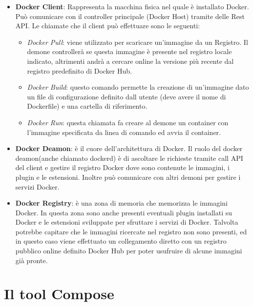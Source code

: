 \begin{itemize}
    \item \textbf{Docker Client}: Rappresenta la macchina fisica nel quale è installato Docker. Può comunicare con il controller principale (Docker Host) tramite delle Rest API.
    Le chiamate che il client può effettuare sono le seguenti:
        \begin{itemize}
            \item \textit{Docker Pull}: viene utilizzato per scaricare un'immagine da un Registro. Il demone controllerà se questa immagine è presente nel registro locale indicato, altrimenti andrà a cercare online
                la versione più recente dal registro predefinito di Docker Hub.
            \item \textit{Docker Build}: questo comando permette la creazione di un'immagine dato un file di configurazione definito dall utente (deve avere il nome di Dockerfile) e una cartella di riferimento.
            \item \textit{Docker Run}: questa chiamata fa creare al demone un container con l'immagine specificata da linea di comando ed avvia il container.
        \end{itemize}
    \item \textbf{Docker Deamon}: è il cuore dell'architettura di Docker. Il ruolo del docker deamon(anche chiamato dockerd) è di ascoltare le richieste tramite call API del client e gestire il registro Docker dove sono contenute
        le immagini, i plugin e le estensioni. Inoltre può comunicare con altri demoni per gestire i servizi Docker.
    \item \textbf{Docker Registry}: è  una zona di memoria che memorizza le immagini Docker. In questa zona sono anche presenti eventuali plugin installati su Docker e le estensioni sviluppate per sfruttare i servizi di Docker.
        Talvolta potrebbe capitare che le immagini ricercate nel registro non sono presenti, ed in questo caso viene effettuato un collegamento diretto con un registro pubblico online definito Docker Hub per poter usufruire di alcune
        immagini già pronte.
\end{itemize}


\section{Il tool Compose}

